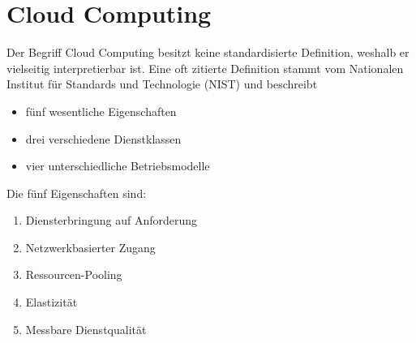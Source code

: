 \chapter{Cloud Computing}\label{chapter:kapitellabel} %
Der Begriff Cloud Computing besitzt keine standardisierte Definition, weshalb
er vielseitig interpretierbar ist. Eine oft zitierte Definition stammt vom
Nationalen Institut für Standards und Technologie (NIST) \cite{baun:springer} und beschreibt
\begin{itemize}
  \item fünf wesentliche Eigenschaften
  \item drei verschiedene Dienstklassen
  \item vier unterschiedliche Betriebsmodelle
\end{itemize}
Die fünf Eigenschaften sind:
\begin{enumerate}
  \item Diensterbringung auf Anforderung
  \item Netzwerkbasierter Zugang
  \item Ressourcen-Pooling
  \item Elastizität
  \item Messbare Dienstqualität
\end{enumerate}


